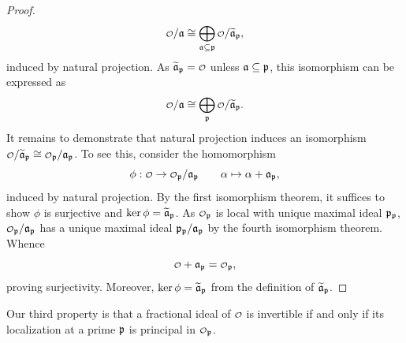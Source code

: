 \begin{proof}
      \[
        \smc{O}/\mf{a} \cong \bigop_{\mf{a} \subseteq \mf{p}}\smc{O}/\wtilde{\mf{a}}_{\mf{p}},
      \]
      induced by natural projection. As \(\wtilde{\mf{a}}_{\mf{p}} = \smc{O}\) unless \(\mathfrak{a} \subseteq \mathfrak{p}\), this isomorphism can be expressed as
      \[
        \smc{O}/\mf{a} \cong \bigop_{\mf{p}}\smc{O}/\wtilde{\mf{a}}_{\mf{p}}.
      \]
      It remains to demonstrate that natural projection induces an isomorphism \(\smc{O}/\wtilde{\mf{a}}_{\mf{p}} \cong \smc{O}_{\mf{p}}/\mf{a}_{\mf{p}}\). To see this, consider the homomorphism
      \[
        \phi:\smc{O} \to \smc{O}_{\mf{p}}/\mf{a}_{\mf{p}} \qquad \a \mapsto \a+\mf{a}_{\mf{p}},
      \]
      induced by natural projection. By the first isomorphism theorem, it suffices to show \(\phi\) is surjective and \(\ker\phi = \widetilde{\mathfrak{a}}_{\mathfrak{p}}\). As \(\smc{O}_{\mf{p}}\) is local with unique maximal ideal \(\mathfrak{p}_{\mathfrak{p}}\), \(\smc{O}_{\mf{p}}/\mf{a}_{\mf{p}}\) has a unique maximal ideal \(\mathfrak{p}_{\mathfrak{p}}/\mathfrak{a}_{\mathfrak{p}}\) by the fourth isomorphism theorem. Whence
      \[
        \smc{O}+\mf{a}_{\mf{p}} = \smc{O}_{\mf{p}},
      \]
      proving surjectivity. Moreover, \(\ker\phi = \widetilde{\mathfrak{a}}_{\mathfrak{p}}\) from the definition of \(\widetilde{\mathfrak{a}}_{\mathfrak{p}}\).
    \end{proof}

    Our third property is that a fractional ideal of \(\smc{O}\) is invertible if and only if its localization at a prime \(\mathfrak{p}\) is principal in \(\smc{O}_{\mf{p}}\).

